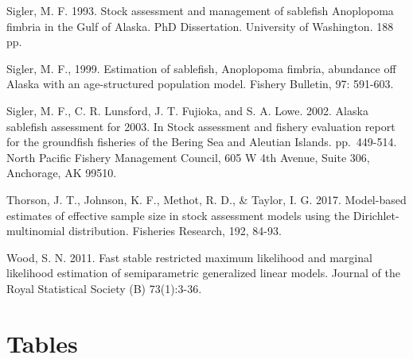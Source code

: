 \documentclass[]{article}
\begin{document}
Sigler, M. F. 1993. Stock assessment and management of sablefish
Anoplopoma fimbria in the Gulf of Alaska. PhD Dissertation. University
of Washington. 188 pp.

Sigler, M. F., 1999. Estimation of sablefish, Anoplopoma fimbria,
abundance off Alaska with an age-structured population model. Fishery
Bulletin, 97: 591-603.

Sigler, M. F., C. R. Lunsford, J. T. Fujioka, and S. A. Lowe. 2002.
Alaska sablefish assessment for 2003. In Stock assessment and fishery
evaluation report for the groundfish fisheries of the Bering Sea and
Aleutian Islands. pp.~449-514. North Pacific Fishery Management Council,
605 W 4th Avenue, Suite 306, Anchorage, AK 99510.

Thorson, J. T., Johnson, K. F., Methot, R. D., \& Taylor, I. G. 2017.
Model-based estimates of effective sample size in stock assessment
models using the Dirichlet-multinomial distribution. Fisheries Research,
192, 84-93.

Wood, S. N. 2011. Fast stable restricted maximum likelihood and marginal
likelihood estimation of semiparametric generalized linear models.
Journal of the Royal Statistical Society (B) 73(1):3-36.

\section{Tables}\label{tables}
\end{document}
